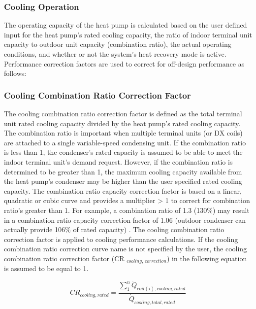 \subsubsection{Cooling Operation}\label{cooling-operation-000}

The operating capacity of the heat pump is calculated based on the user defined input for the heat pump's rated cooling capacity, the ratio of indoor terminal unit capacity to outdoor unit capacity (combination ratio), the actual operating conditions, and whether or not the system's heat recovery mode is active. Performance correction factors are used to correct for off-design performance as follows:

\subsubsection{Cooling Combination Ratio Correction Factor}\label{cooling-combination-ratio-correction-factor}

The cooling combination ratio correction factor is defined as the total terminal unit rated cooling capacity divided by the heat pump's rated cooling capacity. The combination ratio is important when multiple terminal units (or DX coils) are attached to a single variable-speed condensing unit. If the combination ratio is less than 1, the condenser's rated capacity is assumed to be able to meet the indoor terminal unit's demand request. However, if the combination ratio is determined to be greater than 1, the maximum cooling capacity available from the heat pump's condenser may be higher than the user specified rated cooling capacity. The combination ratio capacity correction factor is based on a linear, quadratic or cubic curve and provides a multiplier \textgreater{} 1 to correct for combination ratio's greater than 1. For example, a combination ratio of 1.3 (130\%) may result in a combination ratio capacity correction factor of 1.06 (outdoor condenser can actually provide 106\% of rated capacity) . The cooling combination ratio correction factor is applied to cooling performance calculations. If the cooling combination ratio correction curve name is not specified by the user, the cooling combination ratio correction factor (CR \(_{cooling,\, correction}\)) in the following equation is assumed to be equal to 1.

\begin{equation}
  CR_{cooling,rated} = \frac{\sum \limits_1^n \dot{Q}_{coil(i),cooling,rated}}{\dot{Q}_{cooling,total,rated}}
\end{equation}


